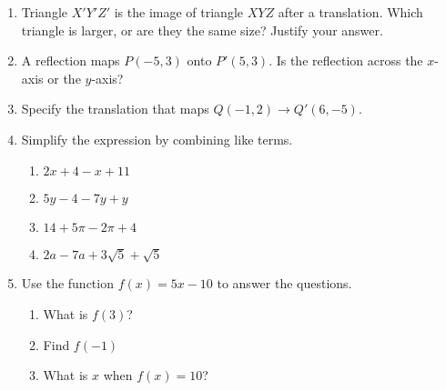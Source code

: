 \documentclass[12pt, twoside]{article}
\begin{document}
\begin{enumerate}[itemsep=0.5cm]
\item Triangle $X'Y'Z'$ is the image of triangle $XYZ$ after a translation. Which triangle is larger, or are they the same size? Justify your answer. \vspace{3cm}

\item A reflection maps $P(-5,3)$ onto $P'(5,3)$. Is the reflection across the $x$-axis or the $y$-axis? \vspace{2cm}

\item Specify the translation that maps $Q(-1,2)\rightarrow Q'(6,-5)$. \vspace{1cm}
\newpage

\item Simplify the expression by combining like terms.
    \begin{multicols}{2}
        \begin{enumerate}[itemsep=0.5cm]
          \item $2x+4-x+11$
          \item $5y-4-7y+y$
          \item $14+5\pi-2\pi+4$
          \item $2a-7a+3\sqrt{5}+\sqrt{5}$
        \end{enumerate}
    \end{multicols}

\item Use the function $f(x) = 5x-10$ to answer the questions.
\begin{multicols}{2}
\begin{enumerate}[itemsep=1cm]
    \item What is $f(3)$?
    \item Find $f(-1)$
    \item What is $x$ when $f(x) = 10$?
\end{enumerate}
\end{multicols} \vspace{1cm}

\end{enumerate}
\end{document}
